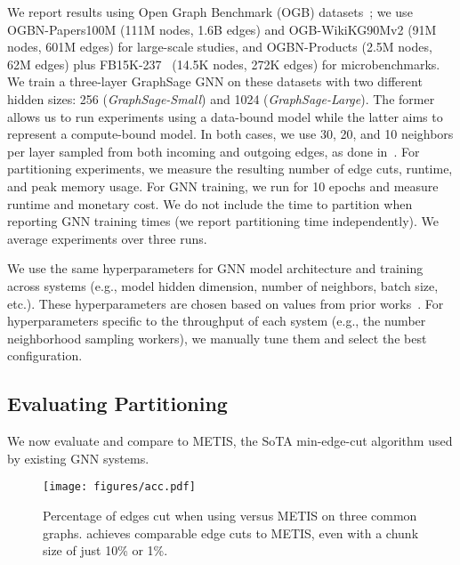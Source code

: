 We report results using Open Graph Benchmark (OGB) datasets~\cite{hu2020ogb, hu2021ogblsc}; we use OGBN-Papers100M (111M nodes, 1.6B edges) and OGB-WikiKG90Mv2 (91M nodes, 601M edges) for large-scale studies, and OGBN-Products (2.5M nodes, 62M edges) plus FB15K-237~\cite{fb15k237} (14.5K nodes, 272K edges) for microbenchmarks. We train a three-layer GraphSage GNN on these datasets with two different hidden sizes: 256 (\textit{GraphSage-Small}) and 1024 (\textit{GraphSage-Large}). The former allows us to run experiments using a data-bound model while the latter aims to represent a compute-bound model. In both cases, we use 30, 20, and 10 neighbors per layer sampled from both incoming and outgoing edges, as done in~\cite{mariusgnn}. For partitioning experiments, we measure the resulting number of edge cuts, runtime, and peak memory usage. For GNN training, we run for 10 epochs and measure runtime and monetary cost. We do not include the time to partition when reporting GNN training times (we report partitioning time independently). We average experiments over three runs.

We use the same hyperparameters for GNN model architecture and training across systems (e.g., model hidden dimension, number of neighbors, batch size, etc.). These hyperparameters are chosen based on values from prior works~\cite{hu2020ogb, mariusgnn}. For hyperparameters specific to the throughput of each system (e.g., the number neighborhood sampling workers), we manually tune them and select the best configuration.



\subsection{Evaluating \partitioning Partitioning}
\label{subsec:eval_partitioning}
We now evaluate \partitioning and compare to METIS, the SoTA min-edge-cut algorithm used by existing GNN systems.

\begin{figure}[t]
  \centering
  \texttt{[image: figures/acc.pdf]}
  \vspace{-0.15in}
  \caption{Percentage of edges cut when using \partitioning versus METIS on three common graphs. \partitioning  achieves comparable edge cuts to METIS, even with a chunk size of just 10\% or 1\%.}
  \label{fig:grem_acc}
  \vspace{-0.1in}
\end{figure}

